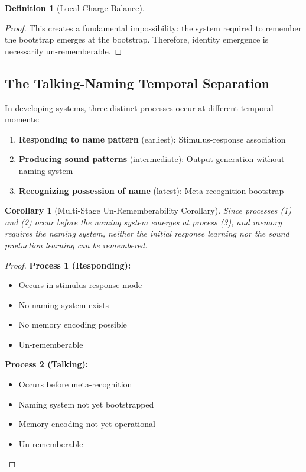 \documentclass[12pt,a4paper]{article}
\theoremstyle{plain}
\newtheorem{corollary}[theorem]{Corollary}
\theoremstyle{definition}
\newtheorem{definition}[theorem]{Definition}
\theoremstyle{remark}
\begin{document}
\begin{definition}[Local Charge Balance]
\begin{proof}
This creates a fundamental impossibility: the system required to remember the bootstrap emerges at the bootstrap. Therefore, identity emergence is necessarily un-rememberable.
\end{proof}

\subsection{The Talking-Naming Temporal Separation}

\begin{observation}
In developing systems, three distinct processes occur at different temporal moments:
\begin{enumerate}
\item \textbf{Responding to name pattern} (earliest): Stimulus-response association
\item \textbf{Producing sound patterns} (intermediate): Output generation without naming system
\item \textbf{Recognizing possession of name} (latest): Meta-recognition bootstrap
\end{enumerate}
\end{observation}

\begin{corollary}[Multi-Stage Un-Rememberability Corollary]
Since processes (1) and (2) occur before the naming system emerges at process (3), and memory requires the naming system, neither the initial response learning nor the sound production learning can be remembered.
\end{corollary}

\begin{proof}
\textbf{Process 1 (Responding):}
\begin{itemize}
\item Occurs in stimulus-response mode
\item No naming system exists
\item No memory encoding possible
\item Un-rememberable
\end{itemize}

\textbf{Process 2 (Talking):}
\begin{itemize}
\item Occurs before meta-recognition
\item Naming system not yet bootstrapped
\item Memory encoding not yet operational
\item Un-rememberable
\end{itemize}


\end{proof}
\end{definition}
\end{document}
